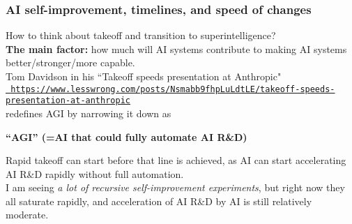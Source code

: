 \documentclass{beamer}
\newenvironment{customquote}
  {\begin{adjustwidth}{2em}{2em}\noindent\textnormal}
  {\end{adjustwidth}}
\newcommand{\msblue}[1]{{\color{myblue} #1}}
\begin{document}
\begin{frame}

  \frametitle{{\bf AI self-improvement}, timelines, and speed of changes}

How to think about takeoff and transition to superintelligence?\\[2ex]

{\bf The main factor:} how much will AI systems contribute to making AI systems better/stronger/more capable.\\[2ex]

Tom Davidson in his ``Takeoff speeds presentation at Anthropic"\\[2ex] 

\href{https://www.lesswrong.com/posts/Nsmabb9fhpLuLdtLE/takeoff-speeds-presentation-at-anthropic}{\tt\tiny \msblue{https://www.lesswrong.com/posts/Nsmabb9fhpLuLdtLE/takeoff-speeds-presentation-at-anthropic}}\\[2ex]

redefines AGI by narrowing it down as\\[2ex]

\begin{customquote}
{\bf “AGI” (=AI that could fully automate AI R\&D)}\\[2ex]
\end{customquote}

Rapid takeoff can start before that line is achieved, as AI can start accelerating AI R\&D rapidly without full automation.\\[2ex]

I am seeing {\em a lot of recursive self-improvement experiments}, but right now they all saturate rapidly, and acceleration of
AI R\&D by AI is still relatively moderate. 

\end{frame}
\end{document}
